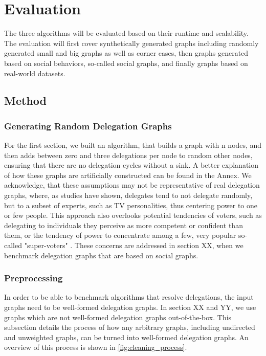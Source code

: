 \graphicspath{ {./figures/} }

\chapter{Evaluation}


The three algorithms will be evaluated based on their runtime and scalability. The evaluation will first cover synthetically generated graphs including randomly generated small and big graphs as well as corner cases, then graphs generated based on social behaviors, so-called social graphs, and finally graphs based on real-world datasets.

\section{Method}

\subsection{Generating Random Delegation Graphs}

For the first section, we built an algorithm, that builds a graph with n nodes, and then adds between zero and three delegations per node to random other nodes, ensuring that there are no delegation cycles without a sink. A better explanation of how these graphs are artificially constructed can be found in the Annex.  We acknowledge, that these assumptions may not be representative of real delegation graphs, where, as studies have shown, delegates tend to not delegate randomly, but to a subset of experts, such as TV personalities, thus centering power to one or few people. This approach also overlooks potential tendencies of voters, such as delegating to individuals they perceive as more competent or confident than them, or the tendency of power to concentrate among a few, very popular so-called "super-voters" \cite{klingVotingBehaviourPower2015}. These concerns are addressed in section XX, when we benchmark delegation graphs that are based on social graphs. 


\subsection{Preprocessing}

In order to be able to benchmark algorithms that resolve delegations, the input graphs need to be well-formed delegation graphs. In section XX and YY, we use graphs which are not well-formed delegation graphs out-of-the-box. This subsection details the process of how any arbitrary graphs, including undirected and unweighted graphs, can be turned into well-formed delegation graphs. An overview of this process is shown in \cref{fig:cleaning_process}.

